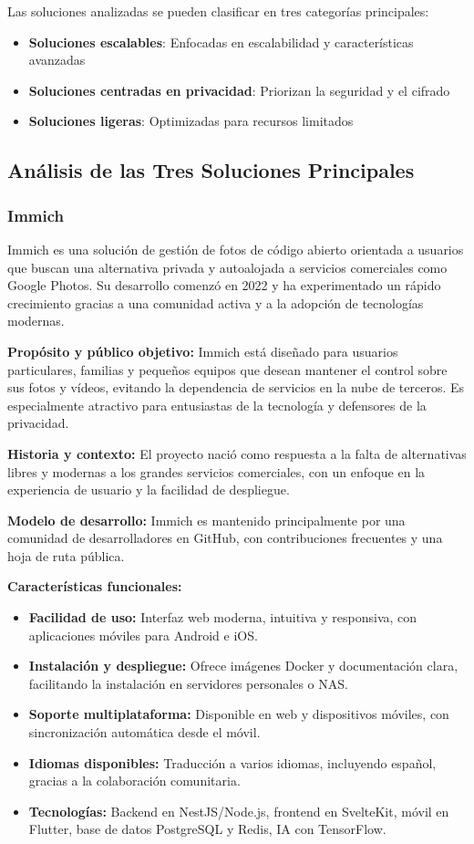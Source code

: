 Las soluciones analizadas se pueden clasificar en tres categorías principales:
\begin{itemize}
    \item \textbf{Soluciones escalables}: Enfocadas en escalabilidad y características avanzadas
    \item \textbf{Soluciones centradas en privacidad}: Priorizan la seguridad y el cifrado
    \item \textbf{Soluciones ligeras}: Optimizadas para recursos limitados
\end{itemize}

\subsection{Análisis de las Tres Soluciones Principales}

\subsubsection{Immich}

Immich es una solución de gestión de fotos de código abierto orientada a usuarios que buscan una alternativa privada y autoalojada a servicios comerciales como Google Photos. Su desarrollo comenzó en 2022 y ha experimentado un rápido crecimiento gracias a una comunidad activa y a la adopción de tecnologías modernas.

\textbf{Propósito y público objetivo:} Immich está diseñado para usuarios particulares, familias y pequeños equipos que desean mantener el control sobre sus fotos y vídeos, evitando la dependencia de servicios en la nube de terceros. Es especialmente atractivo para entusiastas de la tecnología y defensores de la privacidad.

\textbf{Historia y contexto:} El proyecto nació como respuesta a la falta de alternativas libres y modernas a los grandes servicios comerciales, con un enfoque en la experiencia de usuario y la facilidad de despliegue.

\textbf{Modelo de desarrollo:} Immich es mantenido principalmente por una comunidad de desarrolladores en GitHub, con contribuciones frecuentes y una hoja de ruta pública.

\textbf{Características funcionales:}
\begin{itemize}
    \item \textbf{Facilidad de uso:} Interfaz web moderna, intuitiva y responsiva, con aplicaciones móviles para Android e iOS.
    \item \textbf{Instalación y despliegue:} Ofrece imágenes Docker y documentación clara, facilitando la instalación en servidores personales o NAS.
    \item \textbf{Soporte multiplataforma:} Disponible en web y dispositivos móviles, con sincronización automática desde el móvil.
    \item \textbf{Idiomas disponibles:} Traducción a varios idiomas, incluyendo español, gracias a la colaboración comunitaria.
    \item \textbf{Tecnologías:} Backend en NestJS/Node.js, frontend en SvelteKit, móvil en Flutter, base de datos PostgreSQL y Redis, IA con TensorFlow.
\end{itemize}

